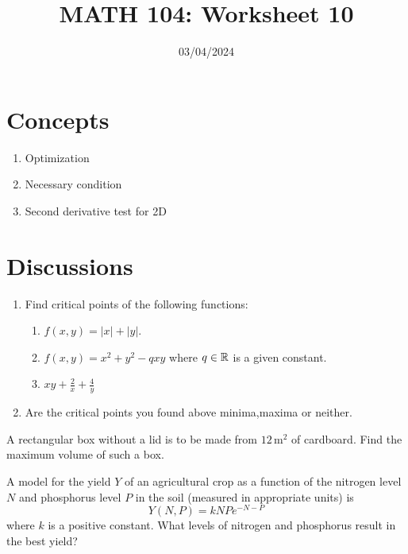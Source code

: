 \documentclass[12pt]{amsart}
\title{ MATH 104: Worksheet 10}
\author{}
\date{03/04/2024}
\begin{document}
\maketitle


\section{Concepts}

\begin{enumerate}
    \item Optimization
    \item Necessary condition
    \item Second derivative test for 2D
\end{enumerate}

\section{Discussions}

\begin{problem}
    \begin{enumerate}
        \item Find critical points of the following functions:
        \begin{enumerate}
            \item $f(x,y) = | x | + | y |$.
            \item $f(x,y) = x^2 + y^2 - qxy$ where $q\in \mathbb{R}$ is a given constant.
            \item $xy + \frac{2}{x} + \frac{4}{y}$
        \end{enumerate}
        \item Are the critical points you found above minima,maxima or neither.
    \end{enumerate}
\end{problem}


\begin{problem}
    A rectangular box without a lid is to be made from \(12 \, \text{m}^2\) of cardboard. 
    Find the maximum volume of such a box.
\end{problem}

\begin{problem}
    A model for the yield $Y$ of an agricultural crop as a function of the nitrogen level $N$ and phosphorus level $P$ in the soil (measured in appropriate units) is
$$
Y(N, P)=k N P e^{-N-P}
$$
where $k$ is a positive constant. What levels of nitrogen and phosphorus result in the best yield?
\end{problem}
\end{document}

